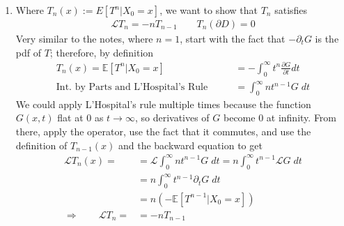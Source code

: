 \documentclass[12pt]{article}
\theoremstyle{plain}
\theoremstyle{definition}
\theoremstyle{remark}
\begin{document}
\begin{enumerate}
  \item %
    Where $T_n(x):=E[T^n|X_0=x]$, we want to show that $T_n$ satisfies
    \begin{align*}
      \mathscr{L}T_n = -n T_{n-1} \qquad T_n(\partial D)=0
    \end{align*}
    Very similar to the notes, where $n=1$, start with the fact that
    $-\partial_t G$ is the pdf of $T$; therefore, by definition
    \begin{align*}
      T_n(x)=\mathbb{E}[T^n|X_0=x]
      &= -\int^\infty_0 t^n \frac{\partial G}{\partial t} dt\\
      \text{Int.\ by Parts and L'Hospital's Rule} \qquad
      &= \int^\infty_0 n t^{n-1} G \; dt
    \end{align*}
    We could apply L'Hospital's rule multiple times because the function
    $G(x,t)$ flat at 0 as $t\rightarrow\infty$, so derivatives of $G$
    become 0 at infinity. From there, apply the operator, use the fact
    that it commutes, and use the definition of $T_{n-1}(x)$ and the
    backward equation to get
    \begin{align*}
      \mathscr{L}T_n(x)=
      &= \mathscr{L}\int^\infty_0 n t^{n-1} G \; dt
      = n\int^\infty_0  t^{n-1} \mathscr{L}G \; dt\\
      &= n\int^\infty_0  t^{n-1} \partial_tG \; dt\\
      &= n(-\mathbb{E}[T^{n-1}|X_0=x])\\
      \Rightarrow\qquad
      \mathscr{L}T_n=
      &= -nT_{n-1}
    \end{align*}

  \end{enumerate}
\end{document}
